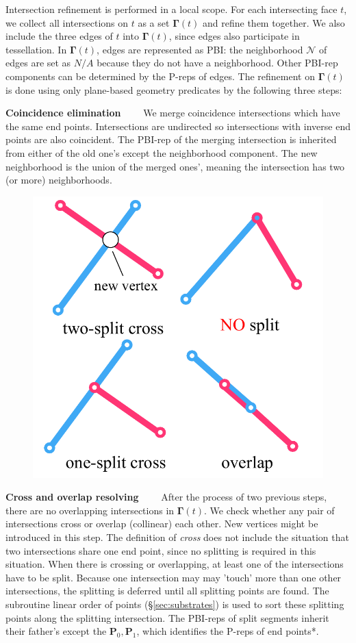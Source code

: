 \documentclass[10pt,journal,compsoc]{IEEEtran}
\begin{document}
Intersection refinement is performed in a local scope. For each intersecting face $t$, we collect all intersections on $t$ as a set $\bm{\Gamma}(t)$ and refine them together. We also include the three edges of $t$ into $\bm{\Gamma}(t)$, since edges also participate in tessellation. In $\bm{\Gamma}(t)$, edges are represented as PBI: the neighborhood $\mathcal{N}$ of edges are set as $N/A$ because they do not have a neighborhood. Other PBI-rep components can be determined by the P-reps of edges. The refinement on $\bm{\Gamma}(t)$ is done using only plane-based geometry predicates by the following three steps:

\vspace{0.5em}
\noindent \textbf{Coincidence elimination}~~~~
We merge coincidence intersections which have the same end points. Intersections are undirected so intersections with inverse end points are also coincident. The PBI-rep of the merging intersection is inherited from either of the old one's except the neighborhood component. The new neighborhood is the union of the merged ones', meaning the intersection has two (or more) neighborhoods.

\begin{figure}
\includegraphics[width=1.7 in]{resolve}
\end{figure}
\vspace{0.5em}
\noindent\textbf{Cross and overlap resolving}~~~~
After the process of two previous steps, there are no overlapping intersections in $\bm{\Gamma}(t)$. We check whether any pair of intersections cross or overlap (collinear) each other. New vertices might be introduced in this step. The definition of \emph{cross} does not include the situation that two intersections share one end point, since no splitting is required in this situation. When there is crossing or overlapping, at least one of the intersections have to be split. Because one intersection may may 'touch' more than one other intersections, the splitting is deferred until all splitting points are found. The subroutine linear order of points (\S\ref{sec:substrates}) is used to sort these splitting points along the splitting intersection. The PBI-reps of split segments inherit their father's except the $\bm{P}_0, \bm{P}_1$, which identifies the P-reps of end points*.
\end{document}
